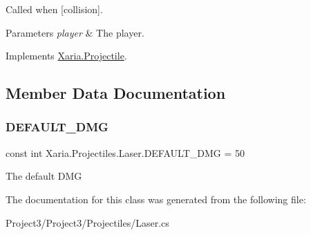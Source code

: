 Called when \mbox{[}collision\mbox{]}. 


\begin{DoxyParams}{Parameters}
{\em player} & The player.\\
\hline
\end{DoxyParams}


Implements \hyperlink{classXaria_1_1Projectile_a57ef6f4c3545ab6f1346b36949dcd3d8}{Xaria.\+Projectile}.



\subsection{Member Data Documentation}
\mbox{\label{classXaria_1_1Projectiles_1_1Laser_a0feea1dcc01170ad2871e16ab7935d60}} 
\subsubsection{\texorpdfstring{D\+E\+F\+A\+U\+L\+T\+\_\+\+D\+MG}{DEFAULT\_DMG}}
{\footnotesize\ttfamily const int Xaria.\+Projectiles.\+Laser.\+D\+E\+F\+A\+U\+L\+T\+\_\+\+D\+MG = 50}



The default D\+MG 



The documentation for this class was generated from the following file\+:\begin{DoxyCompactItemize}
\item 
Project3/\+Project3/\+Projectiles/Laser.\+cs\end{DoxyCompactItemize}
